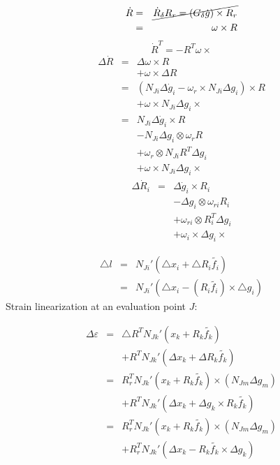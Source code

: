 \begin{eqnarray*}
\dot{R} & = & \cancel{\dot{R}_{\delta}R_{r}=(G_{\delta}\dot{g})\times R_{r}}\\
 & = & \omega\times R
\end{eqnarray*}
\[
\dot{R}^{T}=-R^{T}\omega\times
\]
\begin{eqnarray*}
\Delta\dot{R} & = & \Delta\omega\times R\\
 &  & +\omega\times\Delta R\\
 & = & \left(N_{Ji}\Delta\dot{g}_{i}-\omega_{r}\times N_{Ji}\Delta g_{i}\right)\times R\\
 &  & +\omega\times N_{Ji}\Delta g_{i}\times\\
 & = & N_{Ji}\Delta\dot{g}_{i}\times R\\
 &  & -N_{Ji}\Delta g_{i}\otimes\omega_{r}R\\
 &  & +\omega_{r}\otimes N_{Ji}R^{T}\Delta g_{i}\\
 &  & +\omega\times N_{Ji}\Delta g_{i}\times
\end{eqnarray*}
\begin{eqnarray*}
\Delta\dot{R}_{i} & = & \Delta\dot{g}_{i}\times R_{i}\\
 &  & -\Delta g_{i}\otimes\omega_{ri}R_{i}\\
 &  & +\omega_{ri}\otimes R_{i}^{T}\Delta g_{i}\\
 &  & +\omega_{i}\times\Delta g_{i}\times
\end{eqnarray*}

\begin{eqnarray*}
\triangle l & = & N_{Ji}'(\triangle x_{i}+\triangle R_{i}\tilde{f_{i}})\\
 & = & N_{Ji}'(\triangle x_{i}-(R_{i}\tilde{f_{i}})\times\triangle g_{i})
\end{eqnarray*}
Strain linearization at an evaluation point $J$:

\begin{eqnarray*}
\Delta\varepsilon & = & \triangle R^{T}N_{Jk}'(x_{k}+R_{k}\tilde{f_{k}})\\
 &  & +R^{T}N_{Jk}'(\Delta x_{k}+\Delta R_{k}\tilde{f_{k}})\\
 & = & R_{r}^{T}N_{Jk}'(x_{k}+R_{k}\tilde{f_{k}})\times(N_{Jm}\Delta g_{m})\\
 &  & +R^{T}N_{Jk}'(\Delta x_{k}+\Delta g_{k}\times R_{k}\tilde{f_{k}})\\
 & = & R_{r}^{T}N_{Jk}'(x_{k}+R_{k}\tilde{f_{k}})\times(N_{Jm}\Delta g_{m})\\
 &  & +R_{r}^{T}N_{Jk}'(\Delta x_{k}-R_{k}\tilde{f_{k}}\times\Delta g_{k})
\end{eqnarray*}

